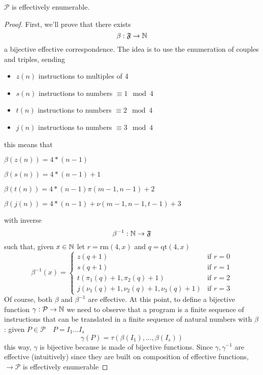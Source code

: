 \begin{theorem}
  $\mathcal{P}$ is effectively enumerable.
  \begin{proof}
    First, we'll prove that there exists
    \[\beta : \mathfrak{F} \to \mathbb{N} \]
    a bijective effective correspondence. The idea is to use the
    enumeration of couples and triples, sending
    \begin{itemize}
    \item $z(n)$ instructions to multiples of 4
    \item $s(n)$ instructions to numbers $\equiv 1 \mod 4$
    \item $t(n)$ instructions to numbers $\equiv 2 \mod 4$
    \item $j(n)$ instructions to numbers $\equiv 3 \mod 4$
    \end{itemize}
    this means that

    $\beta(z(n)) = 4*(n-1)$

    $\beta(s(n)) = 4*(n-1) + 1$

    $\beta(t(n)) = 4*(n-1) \pi(m-1, n-1) + 2$

    $\beta(j(n)) = 4*(n-1) + \nu(m-1, n-1, t-1) + 3$

    with inverse \[\beta^{-1} : \mathbb{N} \to \mathfrak{F}\] such
    that, given $x \in \mathbb{N}$ let $r = \mbox{rm}(4,x)$ and
    $q = \mbox{qt}(4,x)$
    \[
      \beta^{-1}(x) = \begin{cases}
        z(q+1) & \mbox{if } r=0 \\
        s(q+1) & \mbox{if } r=1 \\
        t(\pi_1(q)+1, \pi_2(q)+1) & \mbox{if } r=2 \\
        j(\nu_1(q)+1, \nu_2(q)+1, \nu_3(q)+1) & \mbox{if } r=3
      \end{cases}
    \]
    Of course, both $\beta$ and $\beta^{-1}$ are effective. At this
    point, to define a bijective function
    $\gamma : \mathcal{P} \to \mathbb{N}$ we need to observe that a
    program is a finite sequence of instructions that can
    be translated in a finite sequence of natural numbers with $\beta$ : given
    $P \in \mathcal{P} \quad P = I_1 \dots I_s$
    \[\gamma(P) = \tau(\beta(I_1), \dots, \beta(I_s))\]
    this way, $\gamma$ is bijective because is made of bijective
    functions. Since $\gamma, \gamma^{-1}$ are effective (intuitively)
    since they are built on composition of effective functions,
    $\to \mathcal{P}$ is effectively enumerable
  \end{proof}
\end{theorem}

